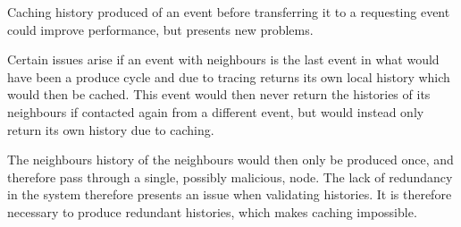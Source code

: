 	\newpar Caching history produced of an event before transferring it to a requesting event could improve performance, but presents new problems. 
	
	Certain issues arise if an event with neighbours is the last event in what would have been a produce cycle and due to tracing returns its own local history which would then be cached. This event would then never return the histories of its neighbours if contacted again from a different event, but would instead only return its own history due to caching. 
	
	The neighbours history of the neighbours would then only be produced once, and therefore pass through a single, possibly malicious, node. The lack of redundancy in the system therefore presents an issue when validating histories.
	It is therefore necessary to produce redundant histories, which makes caching impossible.